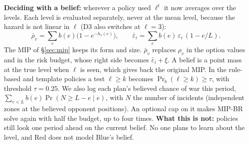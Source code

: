 \begin{addblock}
\textbf{Deciding with a belief:} wherever a policy used $\ell^t$ it now averages over the levels. Each level is
evaluated separately, never at the mean level, because the hazard is not linear in $\ell$ (D3 also switches at $\ell=3$):
\[
\bar\rho_v=\textstyle\sum_e b(e)\big(1-e^{-h_v(e)}\big),\qquad
\bar\varepsilon_i=\sum_e b(e)\,\varepsilon_i\,(1-e/L).
\]
The MIP of \S\ref{sec:mip} keeps its form and size. $\bar\rho_v$ replaces $\rho_v$ in the option values and in the
risk budget, whose right side becomes $\bar\varepsilon_i+\xi$. A belief is a point mass at the true level when $\ell$
is seen, which gives back the original MIP. In the rule-based and template policies a test $\ell\ge k$ becomes
$\Pr_b(\ell\ge k)\ge\tau$, with threshold $\tau=0.25$. We also log each plan's believed chance of war this period,
$\sum_{e<L}b(e)\Pr(N\ge L-e\mid e)$, with $N$ the number of incidents (independent zones at the believed opponent
positions). An optional cap on it makes MIP-BR solve again with half the budget, up to four times.
\textbf{What this is not:} policies still look one period ahead on the current belief. No one plans to learn about
the level, and Red does not model Blue's belief.
\end{addblock}

